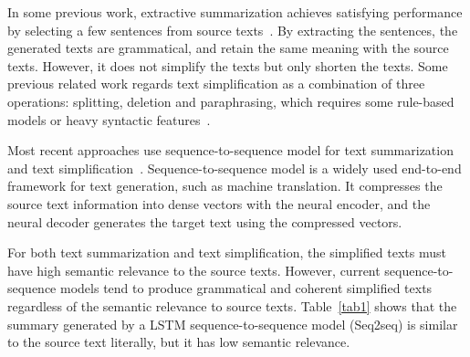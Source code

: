 \documentclass{clv3}
\begin{document}
\begin{CJK*}{UTF8}{gbsn}
In some previous work, extractive summarization achieves satisfying performance by selecting a few sentences from source texts~\cite{extra04,discourse,extra15}. By extracting the sentences, the generated texts are grammatical, and retain the same meaning with the source texts. However, it does not simplify the texts but only shorten the texts. Some previous related work regards text simplification as a combination of three operations: splitting, deletion and paraphrasing, which requires some rule-based models or heavy syntactic features~\cite{ZhuEA2010,Woodsend2011,FilippovaEA2015}. 

Most recent approaches use sequence-to-sequence model for text summarization~\cite{abs,lcsts} and text simplification~\cite{NisioiEA2017,CaoEA2017,ZhangEA2017}. Sequence-to-sequence model is a widely used end-to-end framework for text generation, such as machine translation. It compresses the source text information into dense vectors with the neural encoder, and the neural decoder generates the target text using the compressed vectors.

For both text summarization and text simplification, the simplified texts must have high semantic relevance to the source texts. However, current sequence-to-sequence models tend to produce grammatical and coherent simplified texts regardless of the semantic relevance to source texts. Table~\ref{tab1} shows that the summary generated by a LSTM sequence-to-sequence model (Seq2seq) is similar to the source text literally, but it has low semantic relevance.


\end{CJK*}
\end{document}
